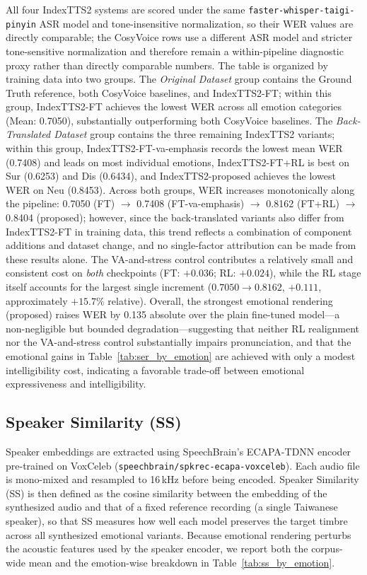 All four IndexTTS2 systems are scored under the same \texttt{faster-whisper-taigi-pinyin} ASR model and tone-insensitive normalization, so their WER values are directly comparable; the CosyVoice rows use a different ASR model and stricter tone-sensitive normalization and therefore remain a within-pipeline diagnostic proxy rather than directly comparable numbers. The table is organized by training data into two groups. The \textit{Original Dataset} group contains the Ground Truth reference, both CosyVoice baselines, and IndexTTS2-FT; within this group, IndexTTS2-FT achieves the lowest WER across all emotion categories (Mean: 0.7050), substantially outperforming both CosyVoice baselines. The \textit{Back-Translated Dataset} group contains the three remaining IndexTTS2 variants; within this group, IndexTTS2-FT-va-emphasis records the lowest mean WER (0.7408) and leads on most individual emotions, IndexTTS2-FT+RL is best on Sur (0.6253) and Dis (0.6434), and IndexTTS2-proposed achieves the lowest WER on Neu (0.8453). Across both groups, WER increases monotonically along the pipeline: 0.7050 (FT) $\rightarrow$ 0.7408 (FT-va-emphasis) $\rightarrow$ 0.8162 (FT+RL) $\rightarrow$ 0.8404 (proposed); however, since the back-translated variants also differ from IndexTTS2-FT in training data, this trend reflects a combination of component additions and dataset change, and no single-factor attribution can be made from these results alone. The VA-and-stress control contributes a relatively small and consistent cost on \emph{both} checkpoints (FT: $+0.036$; RL: $+0.024$), while the RL stage itself accounts for the largest single increment ($0.7050 \rightarrow 0.8162$, $+0.111$, approximately $+15.7\%$ relative). Overall, the strongest emotional rendering (proposed) raises WER by 0.135 absolute over the plain fine-tuned model---a non-negligible but bounded degradation---suggesting that neither RL realignment nor the VA-and-stress control substantially impairs pronunciation, and that the emotional gains in Table~\ref{tab:ser_by_emotion} are achieved with only a modest intelligibility cost, indicating a favorable trade-off between emotional expressiveness and intelligibility.

\subsection{Speaker Similarity (SS)}
\label{section:exp:ss}
Speaker embeddings are extracted using SpeechBrain's ECAPA-TDNN encoder pre-trained on VoxCeleb (\texttt{speechbrain/spkrec-ecapa-voxceleb}). Each audio file is mono-mixed and resampled to 16\,kHz before being encoded. Speaker Similarity (SS) is then defined as the cosine similarity between the embedding of the synthesized audio and that of a fixed reference recording (a single Taiwanese speaker), so that SS measures how well each model preserves the target timbre across all synthesized emotional variants. Because emotional rendering perturbs the acoustic features used by the speaker encoder, we report both the corpus-wide mean and the emotion-wise breakdown in Table~\ref{tab:ss_by_emotion}.

